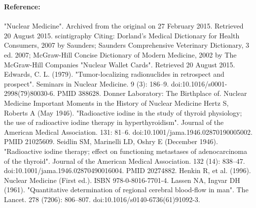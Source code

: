 \documentclass[12pt]{article}
\begin{document}
 

\noindent \textbf{\large Reference:} \\ \\  "Nuclear Medicine". Archived from the original on 27 February 2015. Retrieved 20 August 2015.
 scintigraphy Citing: Dorland's Medical Dictionary for Health Consumers, 2007 by Saunders; Saunders Comprehensive Veterinary Dictionary, 3 ed. 2007; McGraw-Hill Concise Dictionary of Modern Medicine, 2002 by The McGraw-Hill Companies
 "Nuclear Wallet Cards". Retrieved 20 August 2015.
 Edwards, C. L. (1979). "Tumor-localizing radionuclides in retrospect and prospect". Seminars in Nuclear Medicine. 9 (3): 186–9. doi:10.1016/s0001-2998(79)80030-6. PMID 388628.
 Donner Laboratory: The Birthplace of. Nuclear Medicine
 Important Moments in the History of Nuclear Medicine
 Hertz S, Roberts A (May 1946). "Radioactive iodine in the study of thyroid physiology; the use of radioactive iodine therapy in hyperthyroidism". Journal of the American Medical Association. 131: 81–6. doi:10.1001/jama.1946.02870190005002. PMID 21025609.
 Seidlin SM, Marinelli LD, Oshry E (December 1946). "Radioactive iodine therapy; effect on functioning metastases of adenocarcinoma of the thyroid". Journal of the American Medical Association. 132 (14): 838–47. doi:10.1001/jama.1946.02870490016004. PMID 20274882.
 Henkin R, et al. (1996). Nuclear Medicine (First ed.). ISBN 978-0-8016-7701-4.
 Lassen NA, Ingvar DH (1961). "Quantitative determination of regional cerebral blood-flow in man". The Lancet. 278 (7206): 806–807. doi:10.1016/s0140-6736(61)91092-3.


\end{document}
